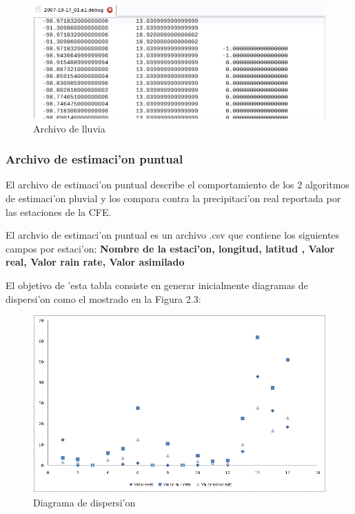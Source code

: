 \begin{figure}[h!]
 \centering
 \includegraphics[width=160mm,bb=0 0 677 262]{./imagenes/archivodebug.jpg}
 \caption{Archivo de lluvia}
\end{figure}

\subsubsection*{Archivo de estimaci'on puntual}
El archivo de estimaci'on puntual describe el comportamiento de los 2 algoritmos de estimaci'on pluvial y los compara
contra la precipitaci'on real reportada por las estaciones de la CFE.

El archvio de estimaci'on puntual es un archivo .csv que contiene los siguientes campos por estaci'on: 
\textbf{Nombre de la estaci'on, longitud, latitud , Valor real, Valor rain rate, Valor asimilado}

El objetivo de 'esta tabla consiste en generar inicialmente diagramas de dispersi'on como el mostrado en la Figura 2.3:

\begin{figure}[h!]
 \centering
 \includegraphics[width=170mm,bb=0 0 837 507]{./imagenes/archivoErrorAnalysis.png}
 \caption{Diagrama de dispersi'on}
\end{figure}

